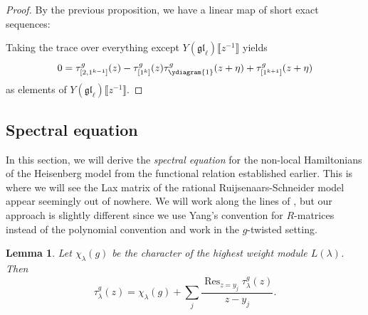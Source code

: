 \documentclass[11pt]{report}
\newtheorem{lemma}[theorem]{Lemma}
\theoremstyle{definition}
\theoremstyle{remark}
\theoremstyle{remark}
\begin{document}
\begin{proof}
By the previous proposition, we have a linear map of short exact sequences: \\
{\small
{}
}

Taking the trace over everything except $Y(\mathfrak{gl}_\ell)\llbracket z^{-1} \rrbracket$ yields
\begin{equation*}
0 = \tau_{[2,1^{k-1}]}^g(z) - \tau_{[1^k]}^g(z) \tau_{\ydiagram{1}}^g(z+\eta) + \tau_{[1^{k+1}]}^g(z+\eta)
\end{equation*}
as elements of $Y(\mathfrak{gl}_\ell)\llbracket z^{-1} \rrbracket$.
\end{proof}

\subsection{Spectral equation}

In this section, we will derive the \emph{spectral equation} for the non-local Hamiltonians of the Heisenberg model from the functional relation established earlier. This is where we will see the Lax matrix of the rational Ruijsenaars-Schneider model appear seemingly out of nowhere. We will work along the lines of \cite{book:arutyunov:betheAnsatz}, but our approach is slightly different since we use Yang's convention for $R$-matrices instead of the polynomial convention and work in the $g$-twisted setting.

\begin{lemma}\label{lemma:transferMatrixExpansion}
Let $\chi_\lambda(g)$ be the character of the highest weight module $L(\lambda)$. Then
\begin{equation*}
\tau_\lambda^g(z) = \chi_\lambda(g) + \sum_j \frac{\operatorname{Res}_{z=y_j} \tau_\lambda^g(z)}{z-y_j}.
\end{equation*}
\end{lemma}
\end{document}

